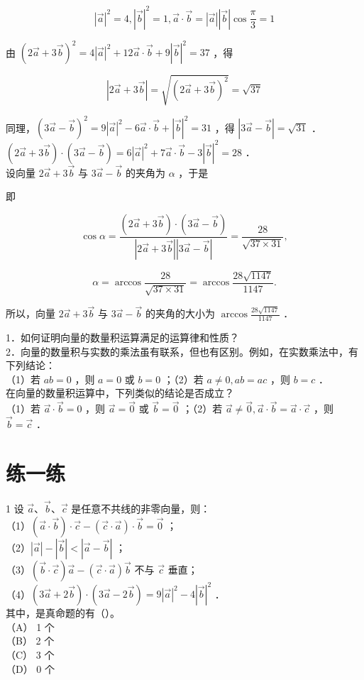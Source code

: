 \documentclass[10pt]{article}
\begin{document}
\[
|\vec{a}|^{2}=4,|\vec{b}|^{2}=1, \vec{a} \cdot \vec{b}=|\vec{a}||\vec{b}| \cos \frac{\pi}{3}=1
\]

由 \((2 \vec{a}+3 \vec{b})^{2}=4|\vec{a}|^{2}+12 \vec{a} \cdot \vec{b}+9|\vec{b}|^{2}=37\) ，得

\[
|2 \vec{a}+3 \vec{b}|=\sqrt{(2 \vec{a}+3 \vec{b})^{2}}=\sqrt{37}
\]

同理，\((3 \vec{a}-\vec{b})^{2}=9|\vec{a}|^{2}-6 \vec{a} \cdot \vec{b}+|\vec{b}|^{2}=31\) ，得 \(|3 \vec{a}-\vec{b}|=\sqrt{31}\) ．\\
\((2 \vec{a}+3 \vec{b}) \cdot(3 \vec{a}-\vec{b})=6|\vec{a}|^{2}+7 \vec{a} \cdot \vec{b}-3|\vec{b}|^{2}=28\) ．\\
设向量 \(2 \vec{a}+3 \vec{b}\) 与 \(3 \vec{a}-\vec{b}\) 的夹角为 \(\alpha\) ，于是

即

\[
\cos \alpha=\frac{(2 \vec{a}+3 \vec{b}) \cdot(3 \vec{a}-\vec{b})}{|2 \vec{a}+3 \vec{b}||3 \vec{a}-\vec{b}|}=\frac{28}{\sqrt{37 \times 31}},
\]

\[
\alpha=\arccos \frac{28}{\sqrt{37 \times 31}}=\arccos \frac{28 \sqrt{1147}}{1147} .
\]

所以，向量 \(2 \vec{a}+3 \vec{b}\) 与 \(3 \vec{a}-\vec{b}\) 的夹角的大小为 \(\arccos \frac{28 \sqrt{1147}}{1147}\) ．

1．如何证明向量的数量积运算满足的运算律和性质？\\
2．向量的数量积与实数的乘法虽有联系，但也有区别。例如，在实数乘法中，有下列结论：\\
（1）若 \(a b=0\) ，则 \(a=0\) 或 \(b=0\) ；（2）若 \(a \neq 0, a b=a c\) ，则 \(b=c\) ．\\
在向量的数量积运算中，下列类似的结论是否成立？\\
（1）若 \(\vec{a} \cdot \vec{b}=0\) ，则 \(\vec{a}=\overrightarrow{0}\) 或 \(\vec{b}=\overrightarrow{0}\) ；（2）若 \(\vec{a} \neq \overrightarrow{0}, \vec{a} \cdot \vec{b}=\vec{a} \cdot \vec{c}\) ，则 \(\vec{b}=\vec{c}\) ．

\section*{练一练}
1 设 \(\vec{a} 、 \vec{b} 、 \vec{c}\) 是任意不共线的非零向量，则：\\
（1）\((\vec{a} \cdot \vec{b}) \cdot \vec{c}-(\vec{c} \cdot \vec{a}) \cdot \vec{b}=\overrightarrow{0}\) ；\\
（2）\(|\vec{a}|-|\vec{b}|<|\vec{a}-\vec{b}|\) ；\\
（3）\((\vec{b} \cdot \vec{c}) \vec{a}-(\vec{c} \cdot \vec{a}) \vec{b}\) 不与 \(\vec{c}\) 垂直；\\
（4）\((3 \vec{a}+2 \vec{b}) \cdot(3 \vec{a}-2 \vec{b})=9|\vec{a}|^{2}-4|\vec{b}|^{2}\) ．\\
其中，是真命题的有（）。\\
（A） 1 个\\
（B） 2 个\\
（C） 3 个\\
（D） 0 个
\end{document}
